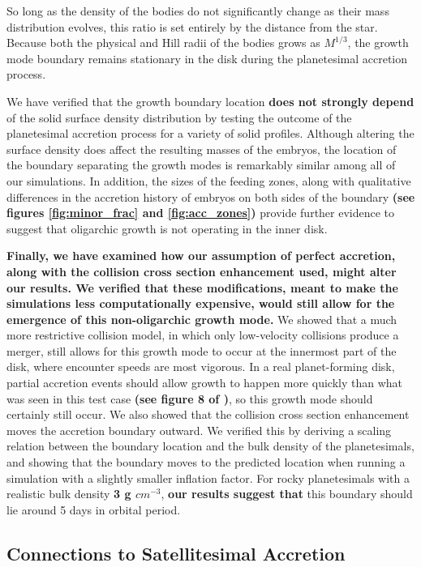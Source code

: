 \documentclass[twocolumn,linenumbers]{aastex63}
\begin{document}
So long as the density of the bodies do not significantly change as
their mass distribution evolves, this ratio is set entirely by the distance
from the star. Because both the physical and Hill radii of the bodies
grows as $M^{1/3}$, the growth mode boundary remains stationary
 in the disk during the planetesimal accretion process.
 
We have verified that the growth boundary location \textbf{does not strongly depend} of the
solid surface density distribution by testing the outcome of the planetesimal
accretion process for a variety of solid
profiles. Although altering the surface density does affect the
resulting masses of the embryos, the location of the boundary
separating the growth modes is remarkably similar among all of our simulations.
In addition, the sizes of the feeding zones, along with qualitative differences in the
accretion history of embryos on both sides of the boundary \textbf{(see figures \ref{fig:minor_frac} and \ref{fig:acc_zones})} provide further evidence to
suggest that oligarchic growth is not operating in the inner disk.

\textbf{Finally, we have examined how our assumption of perfect accretion, along with the collision cross section enhancement used, might alter our results. 
We verified that these modifications, meant to make the simulations less computationally expensive, would still allow for the emergence of this 
non-oligarchic growth mode.}
We showed that a much more restrictive collision model, in which only low-velocity collisions produce a merger, still allows for 
this growth mode to occur at the innermost part of the disk, where encounter speeds are most vigorous. In a real planet-forming 
disk, partial accretion events should allow growth to happen more quickly than what was seen in this test case \textbf{(see figure 8 of \citet{leinhardt15})}, so this growth 
mode should certainly still occur. We also showed that the collision cross section enhancement moves the accretion boundary 
outward. We verified this by deriving a scaling relation between the boundary location and the bulk density of the planetesimals, 
and showing that the boundary moves to the predicted location when running a simulation with a slightly smaller inflation factor. 
For rocky planetesimals with a realistic bulk density \textbf{3 g $cm^{-3}$}, \textbf{our results suggest that} this boundary should lie around 5 days in orbital period.

\subsection{Connections to Satellitesimal Accretion}
\end{document}
